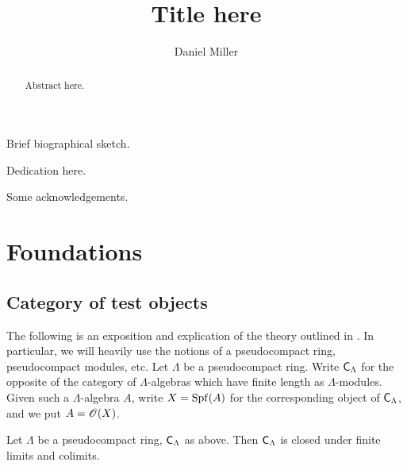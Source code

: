 \documentclass[phd,cornellheadings,draft]{cornell}
\title{Title here}
\author{Daniel Miller}
\begin{document}
\maketitle
\makecopyright

\begin{abstract}
Abstract here. 
\end{abstract}

\begin{biosketch}
Brief biographical sketch.
\end{biosketch}

\begin{dedication}
Dedication here.
\end{dedication}

\begin{acknowledgements}
Some acknowledgements.
\end{acknowledgements}

\contentspage

\normalspacing
\setcounter{page}{1}
\pagestyle{cornell}










\chapter{Foundations}





\section{Category of test objects}

The following is an exposition and explication of the theory outlined in 
\cite[VII\textsubscript{B}, \S 0--1]{sga3-1}. In particular, we will heavily 
use the notions of a pseudocompact ring, pseudocompact modules, etc. Let 
$\Lambda$ be a pseudocompact ring. Write $\mathsf{C}_\Lambda$ for the opposite 
of the category of $\Lambda$-algebras which have finite length as 
$\Lambda$-modules. Given such a $\Lambda$-algebra $A$, write $X=\operatorname{Spf}(A)$ for 
the corresponding object of $\mathsf{C}_\Lambda$, and we put $A=\mathscr{O}(X)$. 

\begin{lemma}
Let $\Lambda$ be a pseudocompact ring, $\mathsf{C}_\Lambda$ as above. Then 
$\mathsf{C}_\Lambda$ is closed under finite limits and colimits. 
\end{lemma}
\end{document}
